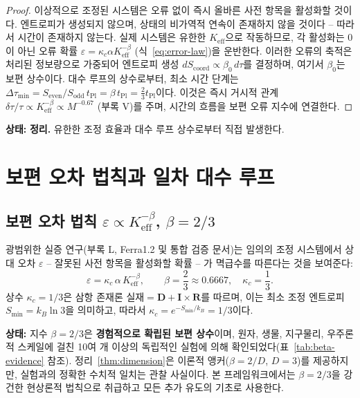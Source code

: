 \documentclass[12pt,a4paper]{article}
\begin{document}
	\begin{proof}
		이상적으로 조정된 시스템은 오류 없이 즉시 올바른 사전 항목을 활성화할 것이다. 엔트로피가 생성되지 않으며, 상태의 비가역적 연속이 존재하지 않을 것이다 – 따라서 시간이 존재하지 않는다. 실제 시스템은 유한한 \(K_{\mathrm{eff}}\)으로 작동하므로, 각 활성화는 0이 아닌 오류 확률 \(\varepsilon = \kappa_c \alpha K_{\mathrm{eff}}^{-\beta}\) (식~\ref{eq:error-law})을 운반한다. 이러한 오류의 축적은 처리된 정보량으로 가중되어 엔트로피 생성 \(dS_{\mathrm{coord}} \propto \beta_0 \, d\tau\)를 결정하며, 여기서 \(\beta_0\)는 보편 상수이다. 대수 루프의 상수로부터, 최소 시간 단계는 \(\Delta \tau_{\min} = S_{\mathrm{even}}/S_{\mathrm{odd}} \, t_{\mathrm{Pl}} = \beta \, t_{\mathrm{Pl}} = \frac{2}{3} t_{\mathrm{Pl}}\)이다. 이것은 즉시 거시적 관계 \(\delta\tau/\tau \propto K_{\mathrm{eff}}^{-\beta} \propto M^{-0.67}\) (부록 V)를 주며, 시간의 흐름을 보편 오류 지수에 연결한다.
	\end{proof}
	
	\textbf{상태:} \textbf{정리.} 유한한 조정 효율과 대수 루프 상수로부터 직접 발생한다.
	
	\section{보편 오차 법칙과 일차 대수 루프}
	\label{sec:error-law}
	
	\subsection{보편 오차 법칙 \(\varepsilon \propto K_{\mathrm{eff}}^{-\beta}\), \(\beta = 2/3\)}
	
	광범위한 실증 연구(부록 L, Ferra1.2 및 통합 검증 문서)는 임의의 조정 시스템에서 상대 오차 \(\varepsilon\) – 잘못된 사전 항목을 활성화할 확률 – 가 멱급수를 따른다는 것을 보여준다:
	\begin{equation}
		\boxed{\varepsilon = \kappa_c \, \alpha \, K_{\mathrm{eff}}^{-\beta}, \qquad \beta = \frac{2}{3} \approx 0.6667,\quad \kappa_c = \frac{1}{3}}.
		\label{eq:error-law}
	\end{equation}
	상수 \(\kappa_c = 1/3\)은 삼항 존재론 \(\text{실재} = \mathbf{D} + \mathbf{I} \times \mathbf{R}\)를 따르며, 이는 최소 조정 엔트로피 \(S_{\min} = k_B \ln 3\)을 의미하고, 따라서 \(\kappa_c = e^{-S_{\min}/k_B} = 1/3\)이다.
	
	\textbf{상태:} 지수 \(\beta = 2/3\)은 \textbf{경험적으로 확립된 보편 상수}이며, 원자, 생물, 지구물리, 우주론적 스케일에 걸친 10여 개 이상의 독립적인 실험에 의해 확인되었다(표~\ref{tab:beta-evidence} 참조). 정리~\ref{thm:dimension}은 이론적 앵커(\(\beta = 2/D\), \(D=3\))를 제공하지만, 실험과의 정확한 수치적 일치는 관찰 사실이다. 본 프레임워크에서는 \(\beta = 2/3\)을 강건한 현상론적 법칙으로 취급하고 모든 추가 유도의 기초로 사용한다.
	
\end{document}
